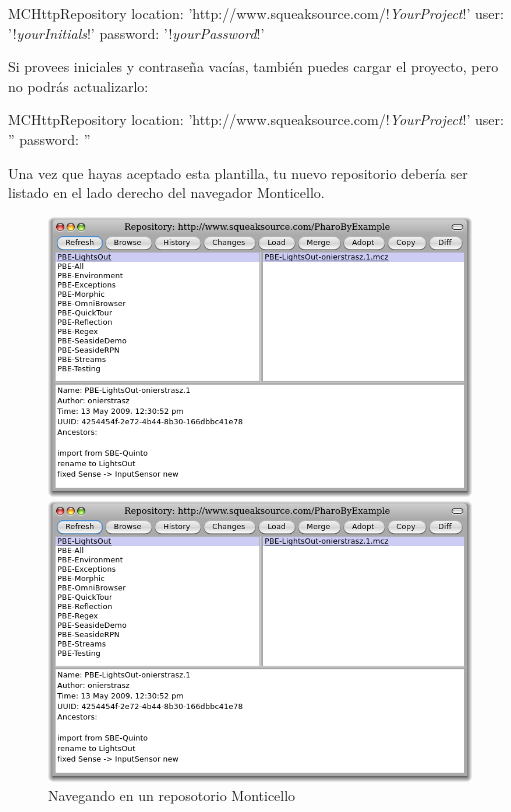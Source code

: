 \documentclass[a4paper,10pt,twoside]{book}
\begin{document}
\begin{code}{}
MCHttpRepository 
    location: 'http://www.squeaksource.com/!\emph{YourProject}!'
    user: '!\emph{yourInitials}!' 
    password: '!\emph{yourPassword}!'
\end{code}   

\noindent
Si provees iniciales y contrase\~na vac\'ias, tambi\'en puedes cargar el proyecto, pero no podr\'as actualizarlo:

\begin{code}{}
MCHttpRepository 
    location: 'http://www.squeaksource.com/!\emph{YourProject}!'
    user: '' 
    password: ''
\end{code}   

Una vez que hayas aceptado esta plantilla, tu nuevo repositorio deber\'ia ser listado en el lado derecho del navegador Monticello. 

\begin{figure}[hbt]
\ifluluelse
	{\centerline {\includegraphics[width=\textwidth]{BrowseRepository}}}
	{\centerline {\includegraphics[scale=0.7]{BrowseRepository}}}
\caption{Navegando en un reposotorio Monticello
}
\end{figure}
\end{document}
